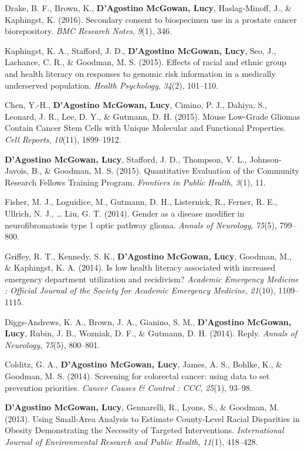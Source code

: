 \documentclass[]{article}
\begin{document}
\hypertarget{ref-Drake:2016ks}{}
Drake, B. F., Brown, K., \textbf{D'Agostino McGowan, Lucy},
Haslag-Minoff, J., \& Kaphingst, K. (2016). Secondary consent to
biospecimen use in a prostate cancer biorepository. \emph{BMC Research
Notes}, \emph{9}(1), 346.

\hypertarget{ref-Kaphingst:2015kl}{}
Kaphingst, K. A., Stafford, J. D., \textbf{D'Agostino McGowan, Lucy},
Seo, J., Lachance, C. R., \& Goodman, M. S. (2015). Effects of racial
and ethnic group and health literacy on responses to genomic risk
information in a medically underserved population. \emph{Health
Psychology}, \emph{34}(2), 101--110.

\hypertarget{ref-Chen:2015ki}{}
Chen, Y.-H., \textbf{D'Agostino McGowan, Lucy}, Cimino, P. J., Dahiya,
S., Leonard, J. R., Lee, D. Y., \& Gutmann, D. H. (2015). Mouse
Low-Grade Gliomas Contain Cancer Stem Cells with Unique Molecular and
Functional Properties. \emph{Cell Reports}, \emph{10}(11), 1899--1912.

\hypertarget{ref-McGowan:2015bt}{}
\textbf{D'Agostino McGowan, Lucy}, Stafford, J. D., Thompson, V. L.,
Johnson-Javois, B., \& Goodman, M. S. (2015). Quantitative Evaluation of
the Community Research Fellows Training Program. \emph{Frontiers in
Public Health}, \emph{3}(1), 11.

\hypertarget{ref-Fisher:2014jt}{}
Fisher, M. J., Loguidice, M., Gutmann, D. H., Listernick, R., Ferner, R.
E., Ullrich, N. J., \ldots{} Liu, G. T. (2014). Gender as a disease
modifier in neurofibromatosis type 1 optic pathway glioma. \emph{Annals
of Neurology}, \emph{75}(5), 799--800.

\hypertarget{ref-Griffey:2014fa}{}
Griffey, R. T., Kennedy, S. K., \textbf{D'Agostino McGowan, Lucy},
Goodman, M., \& Kaphingst, K. A. (2014). Is low health literacy
associated with increased emergency department utilization and
recidivism? \emph{Academic Emergency Medicine : Official Journal of the
Society for Academic Emergency Medicine}, \emph{21}(10), 1109--1115.

\hypertarget{ref-DiggsAndrews:2014fb}{}
Diggs-Andrews, K. A., Brown, J. A., Gianino, S. M., \textbf{D'Agostino
McGowan, Lucy}, Rubin, J. B., Wozniak, D. F., \& Gutmann, D. H. (2014).
Reply. \emph{Annals of Neurology}, \emph{75}(5), 800--801.

\hypertarget{ref-Colditz:2014hh}{}
Colditz, G. A., \textbf{D'Agostino McGowan, Lucy}, James, A. S., Bohlke,
K., \& Goodman, M. S. (2014). Screening for colorectal cancer: using
data to set prevention priorities. \emph{Cancer Causes \& Control :
CCC}, \emph{25}(1), 93--98.

\hypertarget{ref-DAgostinoMcGowan:2013ew}{}
\textbf{D'Agostino McGowan, Lucy}, Gennarelli, R., Lyons, S., \&
Goodman, M. (2013). Using Small-Area Analysis to Estimate County-Level
Racial Disparities in Obesity Demonstrating the Necessity of Targeted
Interventions. \emph{International Journal of Environmental Research and
Public Health}, \emph{11}(1), 418--428.
\end{document}
